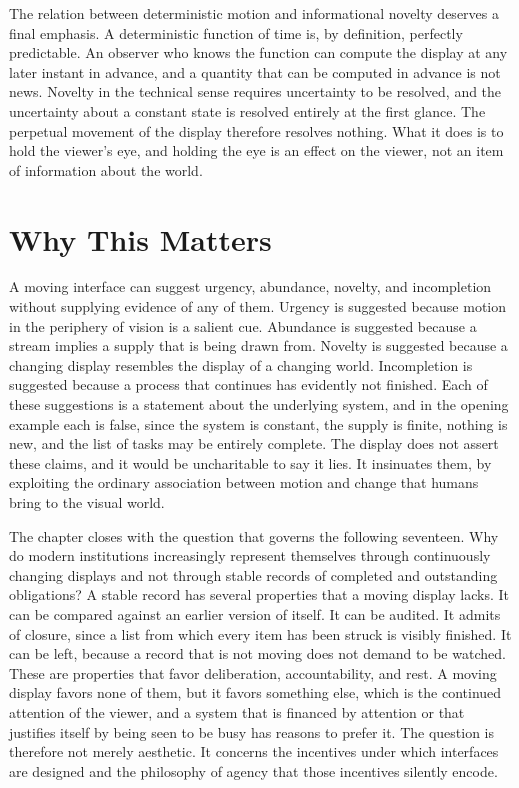 \documentclass[11pt]{report}
\theoremstyle{definition}
\theoremstyle{remark}
\begin{document}
The relation between deterministic motion and informational novelty deserves a final emphasis. A deterministic function of time is, by definition, perfectly predictable. An observer who knows the function can compute the display at any later instant in advance, and a quantity that can be computed in advance is not news. Novelty in the technical sense requires uncertainty to be resolved, and the uncertainty about a constant state is resolved entirely at the first glance. The perpetual movement of the display therefore resolves nothing. What it does is to hold the viewer's eye, and holding the eye is an effect on the viewer, not an item of information about the world.

\section{Why This Matters}

A moving interface can suggest urgency, abundance, novelty, and incompletion without supplying evidence of any of them. Urgency is suggested because motion in the periphery of vision is a salient cue. Abundance is suggested because a stream implies a supply that is being drawn from. Novelty is suggested because a changing display resembles the display of a changing world. Incompletion is suggested because a process that continues has evidently not finished. Each of these suggestions is a statement about the underlying system, and in the opening example each is false, since the system is constant, the supply is finite, nothing is new, and the list of tasks may be entirely complete. The display does not assert these claims, and it would be uncharitable to say it lies. It insinuates them, by exploiting the ordinary association between motion and change that humans bring to the visual world.

The chapter closes with the question that governs the following seventeen. Why do modern institutions increasingly represent themselves through continuously changing displays and not through stable records of completed and outstanding obligations? A stable record has several properties that a moving display lacks. It can be compared against an earlier version of itself. It can be audited. It admits of closure, since a list from which every item has been struck is visibly finished. It can be left, because a record that is not moving does not demand to be watched. These are properties that favor deliberation, accountability, and rest. A moving display favors none of them, but it favors something else, which is the continued attention of the viewer, and a system that is financed by attention or that justifies itself by being seen to be busy has reasons to prefer it. The question is therefore not merely aesthetic. It concerns the incentives under which interfaces are designed and the philosophy of agency that those incentives silently encode.
\end{document}
